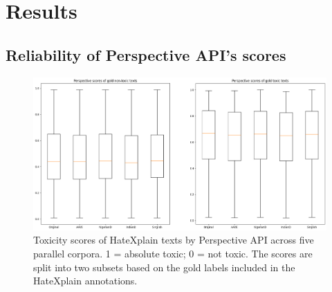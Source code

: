 \documentclass[11pt]{article}
\begin{document}
\section{Results}



\subsection{Reliability of Perspective API's scores}


\begin{figure}[t]
  \includegraphics[width=1.0\linewidth]{figs-misc/all-scores.png}
  \caption{Toxicity scores of HateXplain texts by Perspective API across five parallel corpora. 1 = absolute toxic; 0 = not toxic. The scores are split into two subsets based on the gold labels included in the HateXplain annotations.}
\end{figure}
\end{document}
